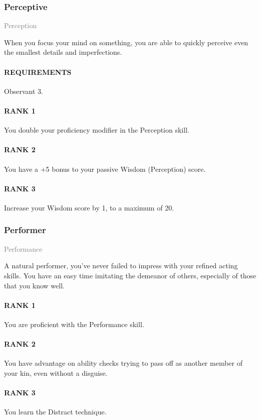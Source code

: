 \subsubsection{Perceptive} \label{tal::perceptive}
\small{\textcolor{gray}{Perception}}

\normalsize
When you focus your mind on something, you are able to quickly perceive even the smallest details and imperfections.
\paragraph{REQUIREMENTS} Observant 3.
\paragraph{RANK 1} You double your proficiency modifier in the Perception skill.
\paragraph{RANK 2} You have a +5 bonus to your passive Wisdom (Perception) score.
\paragraph{RANK 3} Increase your Wisdom score by 1, to a maximum of 20.

\subsubsection{Performer} \label{tal::performer}
\small{\textcolor{gray}{Performance}}

\normalsize
A natural performer, you've never failed to impress with your refined acting skills.
You have an easy time imitating the demeanor of others, especially of those that you know well.
\paragraph{RANK 1} You are proficient with the Performance skill.
\paragraph{RANK 2} You have advantage on ability checks trying to pass off as another member of your kin, even without a disguise.
\paragraph{RANK 3} You learn the Distract technique.

